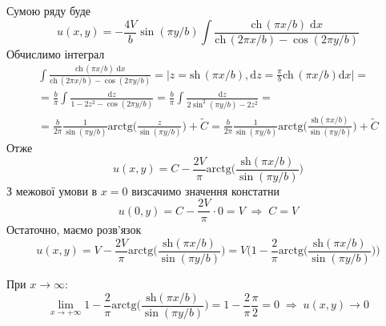 Сумою ряду буде
\begin{equation}
    u(x,y) = -\frac{4V}{b}\sin(\pi y/b) \int \frac{\mathrm{ch\,}(\pi x/b) \;\mathrm{d}x}{\mathrm{ch\,}(2\pi x/b) - \cos(2\pi y/b)}
\end{equation}
Обчислимо інтеграл
\begin{equation*}
    \begin{gathered}
        \int \frac{\mathrm{ch\,}(\pi x/b) \;\mathrm{d}x}{\mathrm{ch\,}(2\pi x/b) - \cos(2\pi y/b)} = \bigg| z = \mathrm{sh\,}(\pi x/b), \mathrm{d}z = \frac{\pi}{b}\mathrm{ch\,}(\pi x/b) \mathrm{d}x\bigg| = \\
        = \frac{b}{\pi} \int \frac{\mathrm{d}z}{1 - 2z^2 - \cos(2\pi y/b)} = \frac{b}{\pi} \int \frac{\mathrm{d}z}{2\sin^2(\pi y/b) - 2z^2} =\\
        = \frac{b}{2\pi} \frac{1}{\sin(\pi y/b)}\mathrm{arctg}\bigg(\frac{z}{\sin(\pi y/b)}\bigg) + \tilde{C} = \frac{b}{2\pi} \frac{1}{\sin(\pi y/b)}\mathrm{arctg}\bigg(\frac{\mathrm{sh}(\pi x/b)}{\sin(\pi y/b)}\bigg) + \tilde{C}
    \end{gathered}
\end{equation*}
Отже
\begin{equation}
    u(x,y) = C - \frac{2V}{\pi} \mathrm{arctg}\bigg(\frac{\mathrm{sh}(\pi x/b)}{\sin(\pi y/b)}\bigg) 
\end{equation}
З межової умови в $x = 0$ визсачимо значення констатни
\begin{equation*}
    u(0,y) = C - \frac{2V}{\pi} \cdot 0 = V \;\Rightarrow\; C = V
\end{equation*}
Остаточно, маємо розв'язок 
\begin{equation}
    u(x,y) = V - \frac{2V}{\pi} \mathrm{arctg}\bigg(\frac{\mathrm{sh}(\pi x/b)}{\sin(\pi y/b)}\bigg) = V \bigg(1 - \frac{2}{\pi} \mathrm{arctg}\bigg(\frac{\mathrm{sh}(\pi x/b)}{\sin(\pi y/b)}\bigg)\bigg)
\end{equation}

При $x \to \infty$: \[\lim_{x\to+\infty} 1 - \frac{2}{\pi} \mathrm{arctg}\bigg(\frac{\mathrm{sh}(\pi x/b)}{\sin(\pi y/b)}\bigg) = 1 - \frac{2}{\pi}\frac{\pi}{2} = 0 \;\Rightarrow\; u(x,y) \to 0\]

%